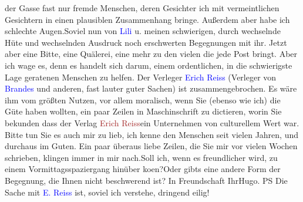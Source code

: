                der Gasse fast nur fremde Menschen, deren Gesichter ich mit vermeintlichen Gesichtern
               in einen plausiblen {\pb}Zusammenhang
               bringe. Außerdem aber habe ich schlechte Augen.\hspace*{1.5em}Soviel nun von \textcolor{blue}{Lili}{}\ledrightnote{\textcolor{blue}{Lili Schnitzler}} u. meinen schwierigen, durch
               wechselnde Hüte und wechselnden Ausdruck noch erschwerten Begegnungen mit ihr. Jetzt
               aber eine Bitte, eine Quälerei, eine mehr zu den vielen die jede Post bringt. Aber
               ich wage es, denn es handelt sich darum, einem ordentlichen, in die schwierigste Lage
               geratenen Menschen zu helfen. Der Verleger \textcolor{blue}{Erich
                  Reiss}{}\ledrightnote{\textcolor{blue}{Erich Reiss}} (Verleger von \textcolor{blue}{Brandes}{}\ledrightnote{\textcolor{blue}{Georg Brandes}} und anderen,
               fast lauter guter Sachen) ist zusammengebrochen. Es wäre ihm vom größten Nutzen, vor
               allem moralisch, wenn Sie (ebenso wie ich) die Güte haben wollten, ein paar Zeilen in
               Maschinschrift zu dictieren, worin Sie bekunden dass der Verlag \textcolor{brown}{Erich Reiss}{}\ledrightnote{\textcolor{brown}{Erich Reiß}}{ }{\pb}ein Unternehmen von culturellem
               Wert war.\pend
           \pstart
           Bitte tun Sie es auch mir zu lieb, ich kenne den Menschen seit vielen Jahren, und
               durchaus im Guten.\pend
           \pstart
           Ein paar überaus liebe Zeilen, die Sie mir vor vielen Wochen schrieben, klingen immer
               in mir nach.\hspace*{1.5em}Soll ich, wenn es freundlicher wird, zu
               einem Vormittagsspaziergang hinüber ko{\geminationm}en?\hspace*{1.5em}Oder gibts eine andere Form der Begegnung, die Ihnen
               nicht beschwerend ist? \pend
           \pstart In Freundschaft Ihr\spacefill\mbox{Hugo.}\pend{}\pstart
           \noindent{}PS Die Sache mit \textcolor{blue}{E. Reiss}{}\ledrightnote{\textcolor{blue}{Erich Reiss}} ist, soviel ich
                  verstehe, dringend eilig!\pend
           \endnumbering{}  
      